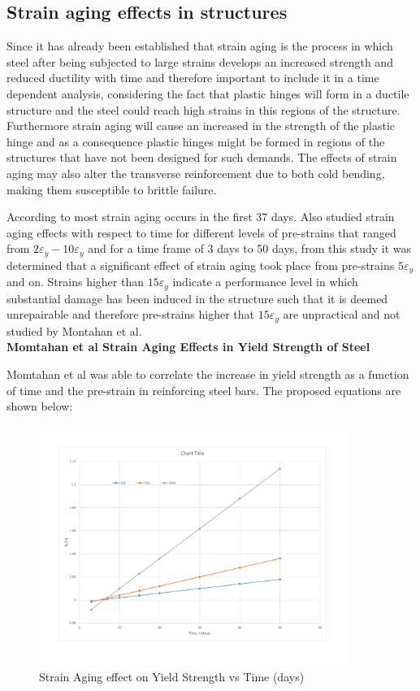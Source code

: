 \subsection{Strain aging effects in structures}

Since it has already been established that strain aging is the process in which steel after being subjected to large strains develops an increased strength and reduced ductility with time and therefore important to include it in a time dependent analysis, considering the fact that plastic hinges will form in a ductile structure and the steel could reach high strains in this regions of the structure. Furthermore strain aging will cause an increased in the strength of the plastic hinge and as a consequence plastic hinges might be formed in regions of the structures that have not been designed for such demands. The effects of strain aging may also alter the transverse reinforcement due to both cold bending, making them susceptible to brittle failure.

According to \cite{Restrepo-Posada1994} most strain aging occurs in the first 37 days. Also \cite{Momtahan2009} studied strain aging effects with respect to time for different levels of pre-strains that ranged from $2\varepsilon_y - 10\varepsilon_y$ and for a time frame of 3 days to 50 days, from this study it was determined that a significant effect of strain aging took place from pre-strains $5\varepsilon_y$ and on. Strains higher than $15\varepsilon_y$ indicate a performance level in which substantial damage has been induced in the structure such that it is deemed unrepairable and therefore pre-strains higher that $15\varepsilon_y$ are unpractical and not studied by Montahan et al\cite{Momtahan2009}.
\\
\textbf{Momtahan et al Strain Aging Effects in Yield Strength of Steel}

Momtahan et al was able to correlate the increase in yield strength as a function of time and the pre-strain in reinforcing steel bars. The proposed equations are shown below:

\begin{figure}[htbp]
\centering
\includegraphics[width=0.9\textwidth]{Chapter-1/figs/StrainAging_TimeDependent}
\caption{Strain Aging effect on Yield Strength vs Time (days)}
\label{fig:hist4}
\end{figure}



